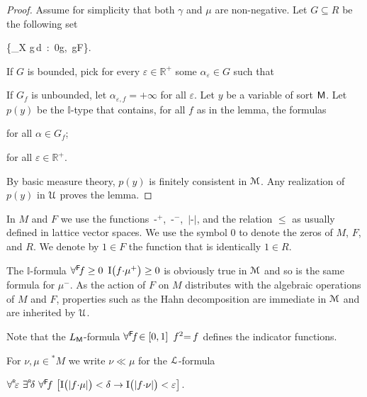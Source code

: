 \documentclass[11pt,oneside]{amsart}
\begin{document}
\begin{proof}
  Assume for simplicity that both $\gamma$ and $\mu$ are non-negative.
  Let $G\subseteq R$ be the following set

   {\bigg\{\int_X g\,{\rm d}\mu\ :\ 0\le g\le\gamma,\ g\in F\bigg\}.}

  If $G$ is bounded, pick for every $\varepsilon\in\mathds{R}^+$ some $\alpha_{\varepsilon}\in G$ such that 

 
  If $G_f$ is unbounded, let $\alpha_{\varepsilon,f}=+\infty$ for all $\varepsilon$.
  Let $y$ be a variable of sort ${\sf M}$.
  Let $p(y)$ be the $\mathds{I}$-type that contains, for all $f$ as in the lemma, the formulas 

  \hfill for all $\alpha\in G_f$;

  \hfill for all $\varepsilon\in\mathds{R}^+$\cdot.

  By basic measure theory, $p(y)$ is finitely consistent in ${\EuScript M}$.
  Any realization of $p(y)$ in ${\EuScript U}$ proves the lemma.
\end{proof}


In $M$ and $F$ we use the functions $\,\mbox{-}^+$, $\,\mbox{-}^-$, $\,|\mbox{-}|$, and the relation $\le$ as usually defined in lattice vector spaces.
We use the symbol $0$ to denote the zeros of $M$, $F$, and $R$.
We denote by $1\in F$ the function that is identically $1\in R$.

The $\mathds{I}$-formula $\forall^{\sf F}\!f\ge0\,\ {\rm I}\big(f{\cdot}\mu^+\big)\ge0$ is obviously true in ${\EuScript M}$ and so is the same formula for $\mu^-$.
As the action of $F$ on $M$ distributes with the algebraic operations of $M$ and $F$, properties such as the Hahn decomposition are immediate in ${\EuScript M}$ and are inherited by $\EuScript U$.

Note that the $L_{\sf M}$-formula $\forall^{\sf F}\!f\!\in[0,1]\,\ f^2{=}\,f$ defines the indicator functions. 

For $\nu,\mu\in{}^*\!M$ we write $\nu\ll\mu$ for the ${\EuScript L}$-formula 

\hfil$\forallR \varepsilon\ \existsR \delta\ \forall^{\sf F}\!f\ \big[{\rm I}\big(|f{\cdot}\mu|\big)<\delta\rightarrow {\rm I}\big(|f{\cdot}\nu|\big)<\varepsilon\big]$.
\end{document}
